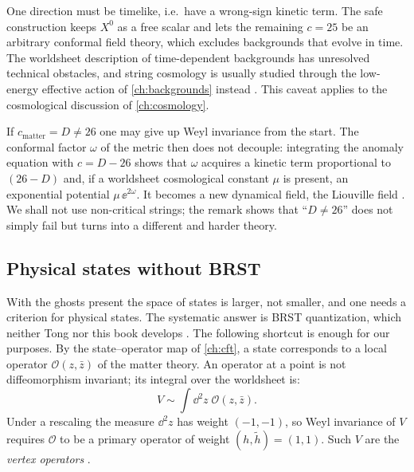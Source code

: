 \begin{remark}[Time]\label{rem:ghosts:time}
One direction must be timelike, i.e.\ have a wrong-sign kinetic term. The safe construction
keeps $X^0$ as a free scalar and lets the remaining $c=25$ be an arbitrary conformal field
theory, which excludes backgrounds that evolve in time. The worldsheet description of
time-dependent backgrounds has unresolved technical obstacles, and string cosmology is
usually studied through the low-energy effective action of \cref{ch:backgrounds} instead
. This caveat applies to the cosmological discussion of
\cref{ch:cosmology}.
\end{remark}

\begin{remark}\label{rem:ghosts:liouville}
If $c_{\mathrm{matter}}=D\neq26$ one may give up Weyl invariance from the start. The
conformal factor $\omega$ of the metric then does not decouple: integrating the anomaly
equation with $c=D-26$ shows that $\omega$ acquires a kinetic term proportional to
$(26-D)$ and, if a worldsheet cosmological constant $\mu$ is present, an exponential
potential $\mu\,\ee^{2\omega}$. It becomes a new dynamical field, the Liouville
field . We shall not use
non-critical strings; the remark shows that ``$D\neq26$'' does not simply fail but turns into
a different and harder theory.
\end{remark}

\subsection{Physical states without BRST}

With the ghosts present the space of states is larger, not smaller, and one needs a criterion
for physical states. The systematic answer is BRST quantization,
which neither Tong nor this book develops . The following
shortcut is enough for our purposes. By the state--operator map of \cref{ch:cft}, a state
corresponds to a local operator $\mathcal O(z,\bar z)$ of the matter theory. An operator at a
point is not diffeomorphism invariant; its integral over the worldsheet is:
\begin{equation}\label{eq:ghosts:vertex}
  V\sim\int\dd^2z\;\mathcal O(z,\bar z).
\end{equation}
Under a rescaling the measure $\dd^2z$ has weight $(-1,-1)$, so Weyl invariance of $V$
requires $\mathcal O$ to be a primary operator of weight $(h,\tilde h)=(1,1)$. Such $V$ are
the \emph{vertex operators} .

